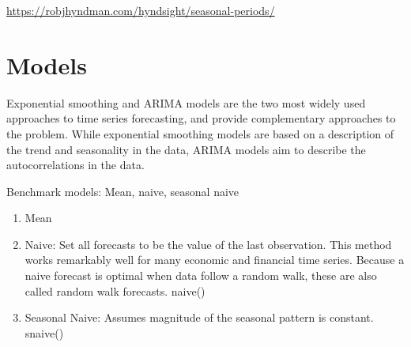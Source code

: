 \documentclass[]{book}
\newenvironment{Shaded}{\begin{snugshade}}{\end{snugshade}}
\newcommand{\KeywordTok}[1]{\textcolor[rgb]{0.13,0.29,0.53}{\textbf{#1}}}
\newcommand{\DataTypeTok}[1]{\textcolor[rgb]{0.13,0.29,0.53}{#1}}
\newcommand{\DecValTok}[1]{\textcolor[rgb]{0.00,0.00,0.81}{#1}}
\newcommand{\FloatTok}[1]{\textcolor[rgb]{0.00,0.00,0.81}{#1}}
\newcommand{\StringTok}[1]{\textcolor[rgb]{0.31,0.60,0.02}{#1}}
\newcommand{\OperatorTok}[1]{\textcolor[rgb]{0.81,0.36,0.00}{\textbf{#1}}}
\newcommand{\NormalTok}[1]{#1}
\theoremstyle{definition}
\theoremstyle{definition}
\theoremstyle{definition}
\theoremstyle{remark}
\begin{document}
\url{https://robjhyndman.com/hyndsight/seasonal-periods/}

\begin{Shaded}
\end{Shaded}

\section{Models}\label{models}

Exponential smoothing and ARIMA models are the two most widely used
approaches to time series forecasting, and provide complementary
approaches to the problem. While exponential smoothing models are based
on a description of the trend and seasonality in the data, ARIMA models
aim to describe the autocorrelations in the data.

Benchmark models: Mean, naive, seasonal naive

\begin{enumerate}
\def\labelenumi{\arabic{enumi}.}
\setcounter{enumi}{-1}
\item
  Mean
\item
  Naive: Set all forecasts to be the value of the last observation. This
  method works remarkably well for many economic and financial time
  series. Because a naive forecast is optimal when data follow a random
  walk, these are also called random walk forecasts. naive()
\item
  Seasonal Naive: Assumes magnitude of the seasonal pattern is constant.
  snaive()
\end{enumerate}
\end{document}
